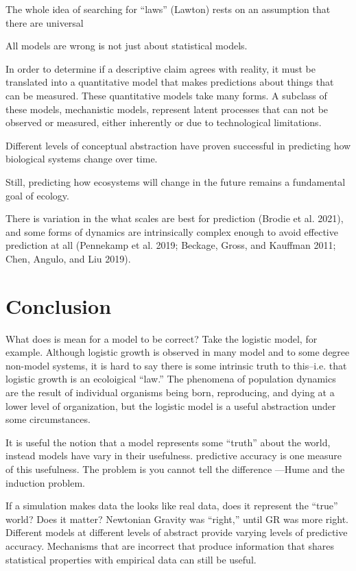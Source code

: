 \documentclass[10pt,oneside]{article}
\begin{document}
The whole idea of searching for ``laws'' (Lawton) rests on an assumption
that there are universal

All models are wrong is not just about statistical models.

In order to determine if a descriptive claim agrees with reality, it
must be translated into a quantitative model that makes predictions
about things that can be measured. These quantitative models take many
forms. A subclass of these models, mechanistic models, represent latent
processes that can not be observed or measured, either inherently or due
to technological limitations.

Different levels of conceptual abstraction have proven successful in
predicting how biological systems change over time.

Still, predicting how ecosystems will change in the future remains a
fundamental goal of ecology.

There is variation in the what scales are best for prediction (Brodie et
al. 2021), and some forms of dynamics are intrinsically complex enough
to avoid effective prediction at all (Pennekamp et al. 2019; Beckage,
Gross, and Kauffman 2011; Chen, Angulo, and Liu 2019).

\hypertarget{conclusion}{%
\section{Conclusion}\label{conclusion}}

What does is mean for a model to be correct? Take the logistic model,
for example. Although logistic growth is observed in many model and to
some degree non-model systems, it is hard to say there is some intrinsic
truth to this--i.e. that logistic growth is an ecoloigical ``law.'' The
phenomena of population dynamics are the result of individual organisms
being born, reproducing, and dying at a lower level of organization, but
the logistic model is a useful abstraction under some circumstances.

It is useful the notion that a model represents some ``truth'' about the
world, instead models have vary in their usefulness. predictive accuracy
is one measure of this usefulness. The problem is you cannot tell the
difference ---Hume and the induction problem.

If a simulation makes data the looks like real data, does it represent
the ``true'' world? Does it matter? Newtonian Gravity was ``right,''
until GR was more right. Different models at different levels of
abstract provide varying levels of predictive accuracy. Mechanisms that
are incorrect that produce information that shares statistical
properties with empirical data can still be useful.
\end{document}

